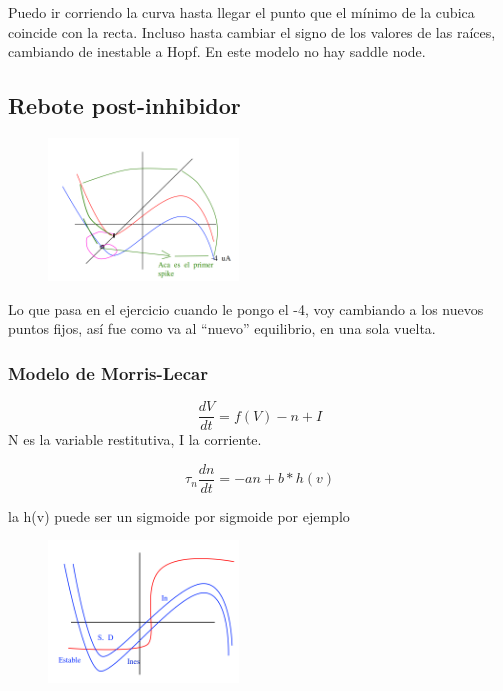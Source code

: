 Puedo ir corriendo la curva hasta llegar el punto que el mínimo de la cubica coincide con la recta. Incluso hasta cambiar el signo de los valores de las raíces, cambiando de inestable a Hopf. En este modelo no hay saddle node.

\subsection{Rebote post-inhibidor}

\begin{figure}[htbp]
	\centering
	\includegraphics[width=0.45\textwidth]{4.png}
\end{figure}


Lo que pasa en el ejercicio cuando le pongo el -4, voy cambiando a los nuevos puntos fijos, así fue como va al ``nuevo'' equilibrio, en una sola vuelta. 


\subsubsection{Modelo de Morris-Lecar}
\begin{equation}
	\frac{dV}{dt} = f(V) -n + I
\end{equation}
N es la variable restitutiva, I la corriente.

\begin{equation}
	\tau_n \frac{dn}{dt}= -an + b*h(v)
\end{equation}

la h(v) puede ser un sigmoide por sigmoide por ejemplo

\begin{figure}[H]
	\centering
	\includegraphics[width=0.45\textwidth]{5.png}
\end{figure}

